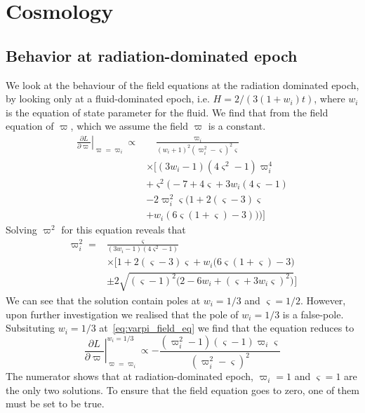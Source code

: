 \documentclass[aps,prd,reprint,preprintnumbers,showpacs,floatfix,nofootinbib,superscriptaddress]{revtex4-2}
\begin{document}
\section{Cosmology}\label{sec:cosmology}

\subsection{Behavior at radiation-dominated epoch}
We look at the behaviour of the field equations at the radiation dominated epoch, by looking only at a fluid-dominated epoch, i.e. $H = 2/(3(1+w_i)t)$, where $w_i$ is the equation of state parameter for the fluid. We find that from the field equation of $\varpi$, which we assume the field $\varpi$ is a constant. 
\begin{equation}
		\label{eq:varpi_field_eq}
		\begin{align}
				\left.\frac{\partial L}{\partial \varpi}\right|_{\varpi=\varpi_i} \propto & \quad \frac{\varpi_i}{(w_i + 1)^2 (\varpi_i^2 - \varsigma)^2 \varsigma}\\
																								   &\times \Biggl[(3 w_i-1)(4 \varsigma^2 - 1) \varpi_i^4 \\
																								& + \varsigma^2\Big( -7 + 4 \varsigma +3 w_i (4 \varsigma -1) \\
																								& -2 \varpi_i^2 \varsigma \big(1+ 2(\varsigma - 3) \varsigma \\
																								& + w_i (6\varsigma (1+\varsigma)-3)\big)\Big)\Biggr]
		\end{align}
\end{equation}
Solving $\varpi^2$ for this equation reveals that
\begin{equation}
		\begin{align}
				\varpi_i^2 = & \frac{\varsigma}{(3 w_i - 1)(4 \varsigma^2 - 1)} \\
						   & \times \Big[1+2(\varsigma-3)\varsigma + w_i \Big(6\varsigma (1+\varsigma)-3\Big) \\
						   & \pm 2 \sqrt{(\varsigma-1)^2 \Big(2 - 6 w_i + (\varsigma + 3 w_i \varsigma)^2\Big)}\Big] 
		\end{align}
\end{equation}
We can see that the solution contain poles at $w_i = 1/3$ and $\varsigma = 1/2$. However, upon further investigation we realised that the pole of $w_i = 1/3$ is a false-pole. Subsituting $w_i = 1/3$ at~\cref{eq:varpi_field_eq} we find that the equation reduces to
\begin{equation}
		\left.\frac{\partial L}{\partial \varpi}\right|_{\varpi=\varpi_i}^{w_i=1/3} \propto -\frac{(\varpi_i^2 - 1)(\varsigma-1)\varpi_i \varsigma }{(\varpi_i^2 - \varsigma)^2}
\end{equation}
The numerator shows that at radiation-dominated epoch, $\varpi_i = 1$ and $\varsigma = 1$ are the only two solutions. To ensure that the field equation goes to zero, one of them must be set to be true.
\end{document}
